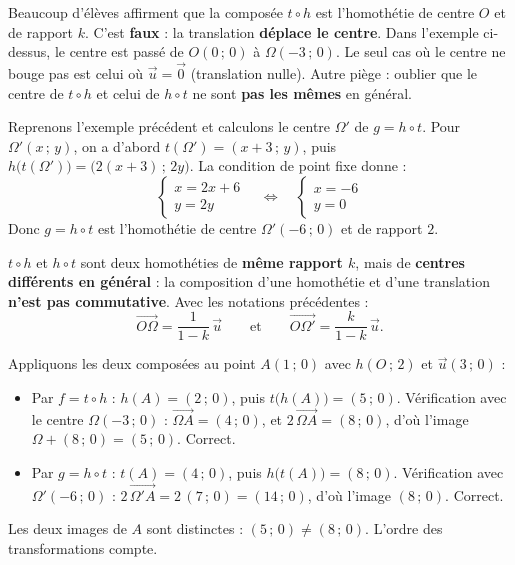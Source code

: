 \documentclass[11pt]{article}
\newcounter{popsec}
\newcounter{popsub}
\newcommand{\courssub}[1]{%
  \stepcounter{popsub}%
  \par\vspace{9pt}\noindent{\popxbold\fontsize{11.5}{13}\selectfont\color{popink}{\color{poporange}\thepopsec.\thepopsub}\hspace{6pt}#1}\par\nopagebreak\vspace{4pt}
}
\begin{document}
\begin{attention}
Beaucoup d'élèves affirment que la composée $t \circ h$ est l'homothétie de centre $O$ et de rapport $k$. C'est \textbf{faux} : la translation \textbf{déplace le centre}. Dans l'exemple ci-dessus, le centre est passé de $O(0\,;\,0)$ à $\Omega(-3\,;\,0)$. Le seul cas où le centre ne bouge pas est celui où $\vec{u} = \vec{0}$ (translation nulle). Autre piège : oublier que le centre de $t \circ h$ et celui de $h \circ t$ ne sont \textbf{pas les mêmes} en général.
\end{attention}

\courssub{Comparaison de $t \circ h$ et $h \circ t$}

Reprenons l'exemple précédent et calculons le centre $\Omega'$ de $g = h \circ t$. Pour $\Omega'(x\,;\,y)$, on a d'abord $t(\Omega') = (x+3\,;\,y)$, puis $h\big(t(\Omega')\big) = \big(2(x+3)\,;\,2y\big)$. La condition de point fixe donne :
\[
\begin{cases}
x = 2x + 6 \\
y = 2y
\end{cases}
\quad\Longleftrightarrow\quad
\begin{cases}
x = -6 \\
y = 0
\end{cases}
\]
Donc $g = h \circ t$ est l'homothétie de centre $\Omega'(-6\,;\,0)$ et de rapport $2$.

\begin{propriete}
$t \circ h$ et $h \circ t$ sont deux homothéties de \textbf{même rapport $k$}, mais de \textbf{centres différents en général} : la composition d'une homothétie et d'une translation \textbf{n'est pas commutative}. Avec les notations précédentes :
\[ \overrightarrow{O\Omega} = \frac{1}{1-k}\,\vec{u} \qquad \text{et} \qquad \overrightarrow{O\Omega'} = \frac{k}{1-k}\,\vec{u}. \]
\end{propriete}

\begin{exemplebox}
Appliquons les deux composées au point $A(1\,;\,0)$ avec $h(O\,;\,2)$ et $\vec{u}(3\,;\,0)$ :
\begin{itemize}
\item Par $f = t \circ h$ : $h(A) = (2\,;\,0)$, puis $t\big(h(A)\big) = (5\,;\,0)$. Vérification avec le centre $\Omega(-3\,;\,0)$ : $\overrightarrow{\Omega A} = (4\,;\,0)$, et $2\,\overrightarrow{\Omega A} = (8\,;\,0)$, d'où l'image $\Omega + (8\,;\,0) = (5\,;\,0)$. Correct.
\item Par $g = h \circ t$ : $t(A) = (4\,;\,0)$, puis $h\big(t(A)\big) = (8\,;\,0)$. Vérification avec $\Omega'(-6\,;\,0)$ : $2\,\overrightarrow{\Omega' A} = 2\,(7\,;\,0) = (14\,;\,0)$, d'où l'image $(8\,;\,0)$. Correct.
\end{itemize}
Les deux images de $A$ sont distinctes : $(5\,;\,0) \neq (8\,;\,0)$. L'ordre des transformations compte.
\end{exemplebox}
\end{document}
